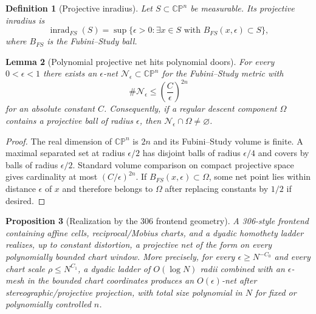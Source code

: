\documentclass[11pt]{article}
\newtheorem{definition}{Definition}[section]
\newtheorem{proposition}[definition]{Proposition}
\newtheorem{lemma}[definition]{Lemma}
\begin{document}
\begin{definition}[Projective inradius]
Let $S\subset\mathbb{CP}^n$ be measurable.  Its projective inradius is
\[
        \operatorname{inrad}_{FS}(S)=
        \sup\{\epsilon>0:\exists x\in S\text{ with }B_{FS}(x,\epsilon)\subset S\},
\]
where $B_{FS}$ is the Fubini--Study ball.
\end{definition}

\begin{lemma}[Polynomial projective net hits polynomial doors]\label{lem:projective-net}
For every $0<\epsilon<1$ there exists an $\epsilon$-net $\mathcal N_\epsilon\subset\mathbb{CP}^n$ for the Fubini--Study metric with
\[
        \#\mathcal N_\epsilon\le \left(\frac{C}{\epsilon}\right)^{2n}
\]
for an absolute constant $C$.  Consequently, if a regular descent component $\Omega$ contains a projective ball of radius $\epsilon$, then $\mathcal N_\epsilon\cap\Omega\ne\varnothing$.
\end{lemma}

\begin{proof}
The real dimension of $\mathbb{CP}^n$ is $2n$ and its Fubini--Study volume is finite.  A maximal separated set at radius $\epsilon/2$ has disjoint balls of radius $\epsilon/4$ and covers by balls of radius $\epsilon/2$.  Standard volume comparison on compact projective space gives cardinality at most $(C/\epsilon)^{2n}$.  If $B_{FS}(x,\epsilon)\subset\Omega$, some net point lies within distance $\epsilon$ of $x$ and therefore belongs to $\Omega$ after replacing constants by $1/2$ if desired.
\end{proof}

\begin{proposition}[Realization by the 306 frontend geometry]\label{prop:frontend-net-realization}
A 306-style frontend containing affine cells, reciprocal/Mobius charts, and a dyadic homothety ladder realizes, up to constant distortion, a projective net of the form  on every polynomially bounded chart window.  More precisely, for every $\epsilon\ge N^{-C_0}$ and every chart scale $\rho\le N^{C_1}$, a dyadic ladder of $O(\log N)$ radii combined with an $\epsilon$-mesh in the bounded chart coordinates produces an $O(\epsilon)$-net after stereographic/projective projection, with total size polynomial in $N$ for fixed or polynomially controlled $n$.
\end{proposition}
\end{document}
